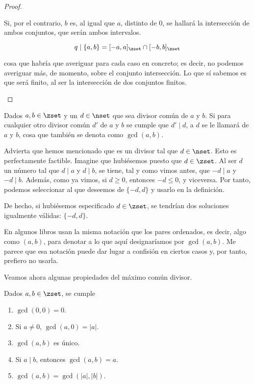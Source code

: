 \begin{proof}
\begin{enumerate}
      Si, por el contrario, $b$ es, al igual que $a$, distinto de 0, se
      hallará la intersección de ambos conjuntos, que serán ambos
      intervalos.

      $$ q \mid \{a, b\} = [{-a}, a]_{\zset} \cap [{-b}, b]_{\zset} $$

      \noindent cosa que habría que averiguar para cada caso en concreto; es
      decir, no podemos averiguar más, de momento, sobre el conjunto
      intersección. Lo que sí sabemos es que será finito, al ser la
      intersección de dos conjuntos finitos.
    \fi
    \end{enumerate}
\end{proof}

\begin{deffinition}
  Dados $a, b \in \zset$ y un $d \in \nset$ que sea divisor común de $a$ y
  $b$. Si para cualquier otro divisor común $d'$ de $a$ y $b$ se cumple que
  $d' \mid d$, a $d$ se le llamará  de $a$ y $b$,
  cosa que también se denota como $\gcd(a, b)$.
\end{deffinition}

Advierta que hemos mencionado que es un divisor tal que $d \in \nset$. Esto
es perfectamente factible. Imagine que hubiésemos puesto que $d \in \zset$.
Al ser $d$ un número tal que $d \mid a$ y $d \mid b$, se tiene, tal y como
vimos antes, que ${-d} \mid a$ y ${-d} \mid b$. Además, como ya vimos, si $d
\geq 0$, entonces ${-d} \leq 0$, y viceversa. Por tanto, podemos seleccionar
al que deseemos de $\{{-d}, d\}$ y usarlo en la definición.

De hecho, si hubiésemos especificado $d \in \zset$, se tendrían dos
soluciones igualmente válidas: $\{{-d}, d\}$.

En algunos libros usan la misma notación que los pares ordenados, es decir,
algo como $(a, b)$, para denotar a lo que aquí designaríamos por $\gcd(a,
b)$. Me parece que esa notación puede dar lugar a confisión en ciertos casos
y, por tanto, prefiero no usarla.

Veamos ahora algunas propiedades del máximo común divisor.

\begin{proposition}\label{prop-mcd}
  Dados $a, b \in \zset$, se cumple

  \begin{enumerate}
    \item $\gcd(0, 0) = 0$.
    \item Si $a \neq 0$, $\gcd(a, 0) = |a|$.
    \item $\gcd(a, b)$ es único.
    \item Si $a \mid b$, entonces $\gcd(a, b) = a$.
    \item $\gcd(a, b) = \gcd(|a|, |b|)$.
  \end{enumerate}
\end{proposition}

